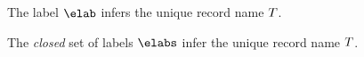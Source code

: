 \documentclass[acmsmall,screen,nonacm%
\Anonymous{,anonymous}{}%
\Final{}{,review}%
]{acmart}
\begin{document}
\judgbox
  {\labuni \elab \T}
  {The label $\elab$ infers the unique record name $T$.}

\begin{judgboxmathpar}
  {\labsuni \elabs \T}
  {The \emph{closed} set of labels $\elabs$ infer the unique record name $T$.}
    {\labuni \elab \T}

    {\labsuni \elabs \T}
\end{judgboxmathpar}
\end{document}
